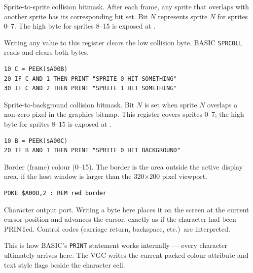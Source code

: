 Sprite-to-sprite collision bitmask.  After each frame, any sprite that
overlaps with another sprite has its corresponding bit set.  Bit $N$ represents
sprite $N$ for sprites 0--7.  The high byte for sprites 8--15 is exposed at
.

\begin{warningbox}
Writing any value to this register clears the low collision byte.  BASIC
\texttt{SPRCOLL} reads and clears both bytes.
\end{warningbox}

\begin{lstlisting}
10 C = PEEK($A00B)
20 IF C AND 1 THEN PRINT "SPRITE 0 HIT SOMETHING"
30 IF C AND 2 THEN PRINT "SPRITE 1 HIT SOMETHING"
\end{lstlisting}



Sprite-to-background collision bitmask.  Bit $N$ is set when sprite $N$
overlaps a non-zero pixel in the graphics bitmap.  This register covers
sprites 0--7; the high byte for sprites 8--15 is exposed at .

\begin{lstlisting}
10 B = PEEK($A00C)
20 IF B AND 1 THEN PRINT "SPRITE 0 HIT BACKGROUND"
\end{lstlisting}



Border (frame) colour (0--15).  The border is the area outside the active
display area, if the host window is larger than the 320$\times$200 pixel
viewport.

\begin{lstlisting}
POKE $A00D,2 : REM red border
\end{lstlisting}



Character output port.  Writing a byte here places it on the screen at the
current cursor position and advances the cursor, exactly as if the character
had been PRINTed.  Control codes (carriage return, backspace, etc.)\ are
interpreted.

This is how BASIC's \texttt{PRINT} statement works internally --- every
character ultimately arrives here.  The VGC writes the current packed colour
attribute and text style flags beside the character cell.

